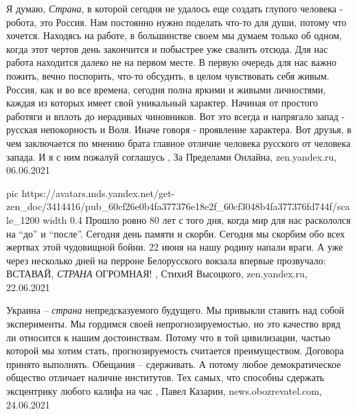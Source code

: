 Я думаю, \emph{Страна}, в которой сегодня не удалось еще создать глупого
человека - робота, это Россия. Нам постоянно нужно поделать что-то для души,
потому что хочется. Находясь на работе, в большинстве своем мы думаем только об
одном, когда этот чертов день закончится и побыстрее уже свалить отсюда. Для
нас работа находится далеко не на первом месте. В первую очередь для нас важно
пожить, вечно поспорить, что-то обсудить, в целом чувствовать себя живым.
Россия, как и во все времена, сегодня полна яркими и живыми личностями, каждая
из которых имеет свой уникальный характер. Начиная от простого работяги и
вплоть до нерадивых чиновников. Вот это всегда и напрягало запад - русская
непокорность и Воля. Иначе говоря - проявление характера.  Вот друзья, в чем
заключается по мнению брата главное отличие человека русского от человека
запада. И я с ним пожалуй соглашусь
, 
За Пределами Онлайна, zen.yandex.ru, 06.06.2021

\ifcmt
  pic https://avatars.mds.yandex.net/get-zen_doc/3414416/pub_60cf26e0b4fa377376e18e2f_60cf3048b4fa377376fd744f/scale_1200
	width 0.4
\fi
Прошло ровно 80 лет с того дня, когда мир для нас раскололся на \enquote{до} и \enquote{после}.
Сегодня день памяти и скорби. Сегодня мы скорбим обо всех жертвах этой
чудовищной бойни. 22 июня на нашу родину напали враги. А уже через несколько
дней на перроне Белорусского вокзала впервые прозвучало: ВСТАВАЙ, \emph{СТРАНА}
ОГРОМНАЯ!
, 
СтихиЯ Высоцкого, zen.yandex.ru, 22.06.2021

Украина – \emph{страна} непредсказуемого будущего. Мы привыкли ставить над собой
эксперименты. Мы гордимся своей непрогнозируемостью, но это качество вряд ли
относится к нашим достоинствам.  Потому что в той цивилизации, частью которой
мы хотим стать, прогнозируемость считается преимуществом. Договора принято
выполнять. Обещания – сдерживать. А потому любое демократическое общество
отличает наличие институтов. Тех самых, что способны сдержать эксцентрику
любого калифа на час
, Павел Казарин, news.obozrevatel.com, 24.06.2021

